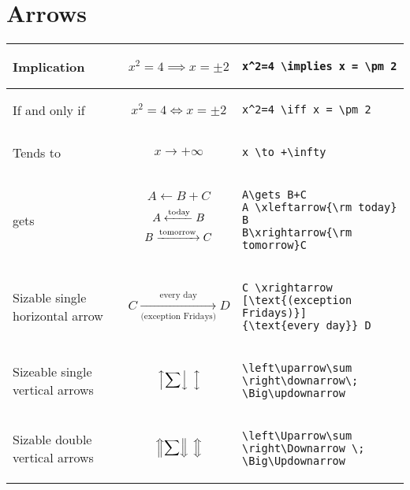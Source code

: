 \section{Arrows}
\begin{longtable}{p{3cm} |p{5cm}| p{5cm}}\hline
    Implication & 
    \[ x^2=4 \implies x = \pm 2
    \]
    & \begin{verbatim}
x^2=4 \implies x = \pm 2
    \end{verbatim} \\\hline
    If and only if & 
    \[
        x^2=4 \iff x = \pm 2
    \] & 
    \begin{verbatim}
x^2=4 \iff x = \pm 2
    \end{verbatim}
    \\\hline
    Tends to &
    \[
        x \to +\infty
    \]
    &
    \begin{verbatim}
x \to +\infty
    \end{verbatim}\\\hline
    gets &
    \[
        A\gets B+C
    \]
    \[ 
        A \xleftarrow{\rm today} B
    \]
    \[
        B\xrightarrow{\rm tomorrow}C
    \]
    &
    \begin{verbatim}
A\gets B+C
A \xleftarrow{\rm today} B
B\xrightarrow{\rm tomorrow}C
    \end{verbatim}
    \\\hline
    Sizable single horizontal arrow &
    \[
    C \xrightarrow
    [\text{(exception Fridays)}]
    {\text{every day}} D
    \]&
    \begin{verbatim}
C \xrightarrow
[\text{(exception Fridays)}]
{\text{every day}} D
\end{verbatim} \\\hline
 Sizeable single vertical arrows &
\[
\left\uparrow\sum \right\downarrow\;
\Big\updownarrow
\]
&
\begin{verbatim}
\left\uparrow\sum \right\downarrow\;
\Big\updownarrow
\end{verbatim}\\\hline
Sizable double vertical arrows &
\[
    \left\Uparrow\sum \right\Downarrow \;
    \Big\Updownarrow
\]
&
\begin{verbatim}
\left\Uparrow\sum \right\Downarrow \;
\Big\Updownarrow
\end{verbatim}
\\\hline






\end{longtable}


